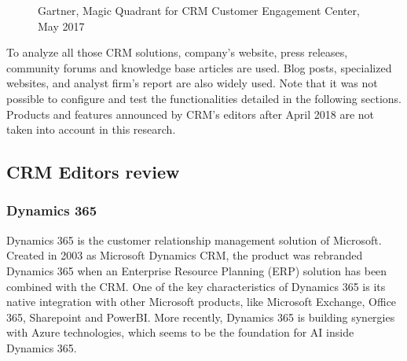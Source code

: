 \begin{figure}[!h]
\begin{minipage}[c]{0.50\linewidth}
        \captionsetup{margin=0.1cm}
        \caption[Magic Quadrant for the CRM Customer Engagement Center]{Gartner, Magic Quadrant for CRM Customer Engagement Center, May 2017}
        \label{fig:magic-quadrant-customer-engagement}
    \end{minipage}
\end{figure}

To analyze all those CRM solutions, company's website, press releases, community forums and knowledge base articles are used. Blog posts, specialized websites, and analyst firm's report are also widely used. Note that it was not possible to configure and test the functionalities detailed in the following sections. Products and features announced by CRM's editors after April 2018 are not taken into account in this research.

\subsection{CRM Editors review}
\label{sec:crm-editors-review}

\subsubsection*{Dynamics 365}
Dynamics 365 is the customer relationship management solution of Microsoft. Created in 2003 as Microsoft Dynamics CRM, the product was rebranded Dynamics 365 when an Enterprise Resource Planning (ERP) solution has been combined with the CRM. One of the key characteristics of Dynamics 365 is its native integration with other Microsoft products, like Microsoft Exchange, Office 365, Sharepoint and PowerBI. More recently, Dynamics 365 is building synergies with Azure technologies, which seems to be the foundation for AI inside Dynamics 365. 

